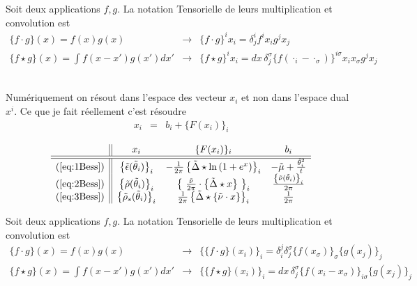 Soit deux applications $f , g $. La notation Tensorielle de leurs multiplication et convolution est 
\begin{eqnarray}
	\{f \cdot   g \} ( x ) = f(x)  g(x) & \rightarrow & \{ f \cdot g \}^i x_i = \delta^i_j f^ix_i g^j x_j  \\
	\{f \star  g \} ( x ) = {\textstyle \int f ( x - x' ) g ( x' )  d x '}  & \rightarrow &	 \{ f \star g  \}^i x_i  = dx \, \delta^\sigma_j \{  f ( \cdot_i -\cdot_\sigma  )\}^{i\sigma } x_i x_\sigma   g^j x_j   
\end{eqnarray}


{~}\\

Numériquement on résout dans l'espace des vecteur $x_i$ et non dans l'espace dual $x^i$. Ce que je fait réellement c'est résoudre 
\begin{eqnarray}
	x_i  & = & b_i  + \{F(x_i) \}_i  	
\end{eqnarray}

$$
\begin{array}{c||ccc}
	& x_i & \{F(x_i) \}_i & b_i \\
	\hline\hline
	(\ref{eq:1Bess}) & \left \{\tilde{\epsilon}(\tilde{\theta}_i) \right \}_i  & -\frac{1}{2 \pi} \left \{\tilde{\Delta} \star \ln \left ( 1 + e^{x } \right )  \right \}_i  & - \tilde{\mu} + \frac{\tilde{\theta}_i^2 }{t}	\\
	(\ref{eq:2Bess}) & \left \{\tilde{\rho}(\tilde{\theta}_i) \right \}_i  &  \left  \{ \frac{\tilde{\nu}}{2 \pi} \cdot \left \{\tilde{\Delta} \star x \right  \} \right \}_i & \frac{\left \{\tilde{\nu}(\tilde{\theta}_i) \right \}_i}{2 \pi} \\
	(\ref{eq:3Bess}) &  \left \{\tilde{\rho}_s(\tilde{\theta}_i) \right \}_i & \frac{1}{2 \pi} \left \{\tilde{\Delta} \star \{\tilde{\nu} \cdot  x\} \right \}_i & \frac{1}{2 \pi} 
\end{array}\\
$$

Soit deux applications $f , g $. La notation Tensorielle de leurs multiplication et convolution est 
\begin{eqnarray}
	\{f \cdot   g \} ( x ) = f(x)  g(x) & \rightarrow & \{ \{ f \cdot g \}( x_i )\}_i   = \delta^j_i \delta^\sigma_j \{f ( x_\sigma ) \}_\sigma \{g(x_j ) \}_j    \\
	\{f \star  g \} ( x ) = {\textstyle \int f ( x - x' ) g ( x' )  d x '}  & \rightarrow &	 \{\{ f \star g  \}(x_i)\}_i  = dx \, \delta^\sigma_j \{  f ( x_i -x_\sigma  )\}_{i\sigma }    \{g ( x_j)\}_j    
\end{eqnarray}


